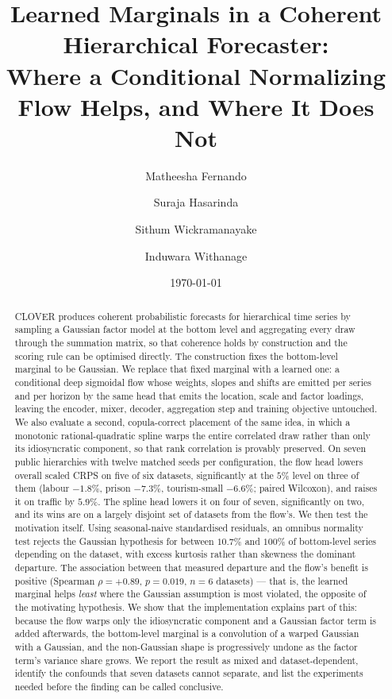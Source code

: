 \documentclass[11pt]{article}
\title{Learned Marginals in a Coherent Hierarchical Forecaster:\\
Where a Conditional Normalizing Flow Helps, and Where It Does Not}
\author{Matheesha Fernando \and Suraja Hasarinda \and Sithum Wickramanayake \and
Induwara Withanage}
\date{\today}
\begin{document}
\maketitle

\begin{abstract}
CLOVER produces coherent probabilistic forecasts for hierarchical time series by
sampling a Gaussian factor model at the bottom level and aggregating every draw
through the summation matrix, so that coherence holds by construction and the
scoring rule can be optimised directly. The construction fixes the bottom-level
marginal to be Gaussian. We replace that fixed marginal with a learned one: a
conditional deep sigmoidal flow whose weights, slopes and shifts are emitted per
series and per horizon by the same head that emits the location, scale and factor
loadings, leaving the encoder, mixer, decoder, aggregation step and training
objective untouched. We also evaluate a second, copula-correct placement of the
same idea, in which a monotonic rational-quadratic spline warps the entire
correlated draw rather than only its idiosyncratic component, so that rank
correlation is provably preserved. On seven public hierarchies with twelve
matched seeds per configuration, the flow head lowers overall scaled CRPS on five
of six datasets, significantly at the $5\%$ level on three of them (labour
$-1.8\%$, prison $-7.3\%$, tourism-small $-6.6\%$; paired Wilcoxon), and raises
it on traffic by $5.9\%$. The spline head lowers it on four of seven,
significantly on two, and its wins are on a largely disjoint set of datasets from
the flow's. We then test the motivation itself. Using seasonal-naive
standardised residuals, an omnibus normality test rejects the Gaussian
hypothesis for between $10.7\%$ and $100\%$ of bottom-level series depending on
the dataset, with excess kurtosis rather than skewness the dominant departure.
The association between that measured departure and the flow's benefit is
positive (Spearman $\rho=+0.89$, $p=0.019$, $n=6$ datasets) --- that is, the
learned marginal helps \emph{least} where the Gaussian assumption is most
violated, the opposite of the motivating hypothesis. We show that the
implementation explains part of this: because the flow warps only the
idiosyncratic component and a Gaussian factor term is added afterwards, the
bottom-level marginal is a convolution of a warped Gaussian with a Gaussian, and
the non-Gaussian shape is progressively undone as the factor term's variance
share grows. We report the result as mixed and dataset-dependent, identify the
confounds that seven datasets cannot separate, and list the experiments needed
before the finding can be called conclusive.
\end{abstract}
\end{document}
